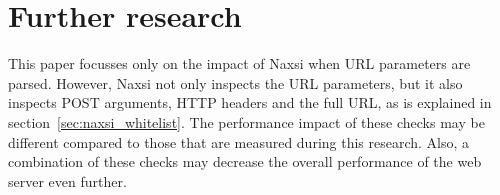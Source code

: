 \documentclass[Further research]{subfiles}
\begin{document}
\section{Further research}
\label{sec:Further research}

This paper focusses only on the impact of Naxsi when \ac{URL} parameters are parsed. However, Naxsi not only inspects the \ac{URL} parameters, but it also inspects POST arguments, HTTP headers and the full URL, as is explained in section~\ref{sec:naxsi_whitelist}. The performance impact of these checks may be different compared to those that are measured during this research. Also, a combination of these checks may decrease the overall performance of the web server even further.
\end{document}
